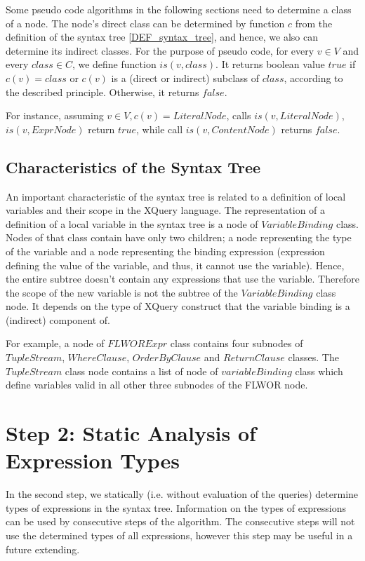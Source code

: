 Some pseudo code algorithms in the following sections need to determine a class of a node. The node's direct class can be determined by function $c$ from the definition of the syntax tree \ref{DEF_syntax_tree}, and hence, we also can determine its indirect classes. For the purpose of pseudo code, for every $v \in V$ and every $class \in C$, we define function $is(v, class)$. It returns boolean value $true$ if $c(v) = class$ or $c(v)$ is a (direct or indirect) subclass of $class$, according to the described principle. Otherwise, it returns $false$.

For instance, assuming $v \in V, c(v) = LiteralNode$, calls $is(v, LiteralNode)$, $is(v, ExprNode)$ return $true$, while call $is(v, ContentNode)$ returns $false$.

\subsection{Characteristics of the Syntax Tree}
An important characteristic of the syntax tree is related to a definition of local variables and their scope in the XQuery language. The representation of a definition of a local variable in the syntax tree is a node of $VariableBinding$ class. Nodes of that class contain have only two children; a node representing the type of the variable and a node representing the binding expression (expression defining the value of the variable, and thus, it cannot use the variable). Hence, the entire subtree doesn't contain any expressions that use the variable. Therefore the scope of the new variable is not the subtree of the $VariableBinding$ class node. It depends on the type of XQuery construct that the variable binding is a (indirect) component of.

For example, a node of $FLWORExpr$ class contains four subnodes of $TupleStream$, $WhereClause$, $OrderByClause$ and $ReturnClause$ classes. The $TupleStream$ class node contains a list of node of $variableBinding$ class which define variables valid in all other three subnodes of the FLWOR node.



\section{Step 2: Static Analysis of Expression Types}
In the second step, we statically (i.e. without evaluation of the queries) determine types of expressions in the syntax tree. Information on the types of expressions can be used by consecutive steps of the algorithm. The consecutive steps will not use the determined types of all expressions, however this step may be useful in a future extending.

